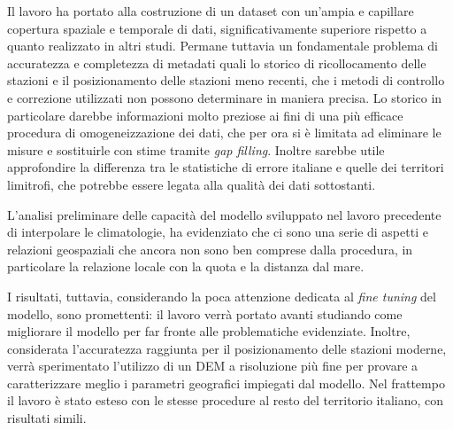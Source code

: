 Il lavoro ha portato alla costruzione di un dataset con un'ampia e capillare copertura spaziale e temporale di dati, significativamente superiore rispetto a quanto realizzato in altri studi. Permane tuttavia un fondamentale problema di accuratezza e completezza di metadati quali lo storico di ricollocamento delle stazioni e il posizionamento delle stazioni meno recenti, che i metodi di controllo e correzione utilizzati non possono determinare in maniera precisa. Lo storico in particolare darebbe informazioni molto preziose ai fini di una più efficace procedura di omogeneizzazione dei dati, che per ora si è limitata ad eliminare le misure e sostituirle con stime tramite \emph{gap filling}. Inoltre sarebbe utile approfondire la differenza tra le statistiche di errore italiane e quelle dei territori limitrofi, che potrebbe essere legata alla qualità dei dati sottostanti.

L'analisi preliminare delle capacità del modello sviluppato nel lavoro precedente di interpolare le climatologie, ha evidenziato che ci sono una serie di aspetti e relazioni geospaziali che ancora non sono ben comprese dalla procedura, in particolare la relazione locale con la quota e la distanza dal mare.

I risultati, tuttavia, considerando la poca attenzione dedicata al \emph{fine tuning} del modello, sono promettenti: il lavoro verrà portato avanti studiando come migliorare il modello per far fronte alle problematiche evidenziate. Inoltre, considerata l'accuratezza raggiunta per il posizionamento delle stazioni moderne, verrà sperimentato l'utilizzo di un DEM a risoluzione più fine per provare a caratterizzare meglio i parametri geografici impiegati dal modello.
Nel frattempo il lavoro è stato esteso con le stesse procedure al resto del territorio italiano, con risultati simili.